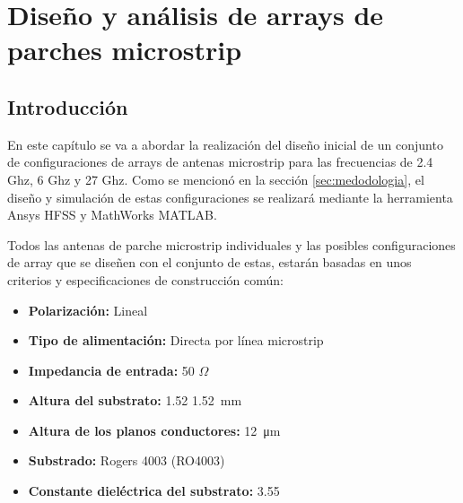 
\chapter{Diseño y análisis de arrays de parches microstrip}
\label{diseño}

\section{Introducción}

\par En este capítulo se va a abordar la realización del diseño inicial de un conjunto de configuraciones de arrays de antenas microstrip para las frecuencias de 2.4 Ghz, 6 Ghz y 27 Ghz. Como se mencionó en la sección \ref{sec:medodologia}, el diseño y simulación de estas configuraciones se realizará mediante la herramienta Ansys \sffamily\textregistered  HFSS y MathWorks \sffamily\textregistered  MATLAB.
\\
\par Todos las antenas de parche microstrip individuales y las posibles configuraciones de array que se diseñen con el conjunto de estas, estarán basadas en unos criterios y especificaciones de construcción común:

\begin{itemize}
	\item \textbf{Polarización: }Lineal
	\item \textbf{Tipo de alimentación: } Directa por línea microstrip
	\item \textbf{Impedancia de entrada: }50 $\Omega$
	\item \textbf{Altura del substrato: }1.52 \SI{1.52}{\milli\metre}
	\item \textbf{Altura de los planos conductores: }\SI{12}{\micro\metre} 
	\item \textbf{Substrado: }Rogers 4003 (RO4003)
	\item \textbf{Constante dieléctrica del substrato: }3.55
\end{itemize}

